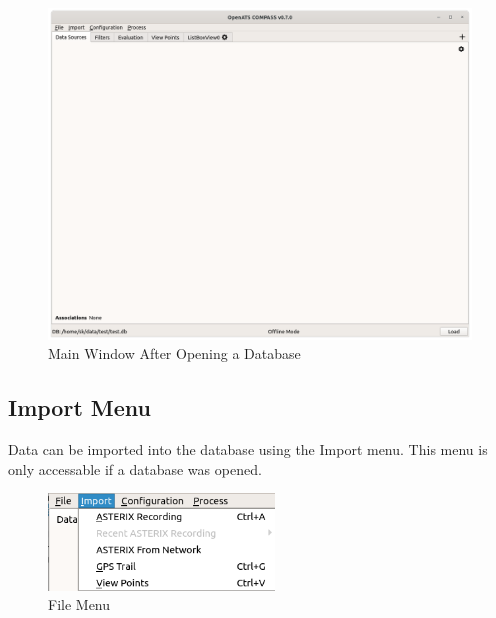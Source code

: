 \begin{figure}[H]
  \hspace*{-2.5cm}
    \includegraphics[width=19cm]{figures/main_window_opened.png}
  \caption{Main Window After Opening a Database}
\end{figure}

\subsection{Import Menu}
\label{sec:ui_overview_import_menu}

Data can be imported into the database using the Import menu. This menu is only accessable if a database was opened.

\begin{figure}[H]
  \center
    \includegraphics[width=6cm,frame]{figures/ui_import_menu.png}
  \caption{File Menu}
\end{figure}

